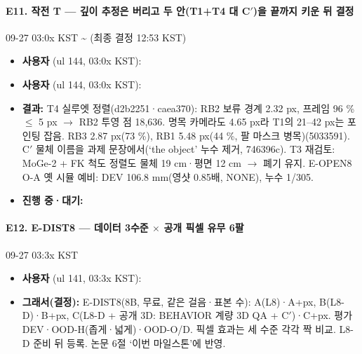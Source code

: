 \paragraph{E11. 작전 T --- 깊이 추정은 버리고 두 안(T1+T4 대 C$'$)을 끝까지 키운 뒤 결정}
{\small 09-27 03:0x KST \textasciitilde{} (최종 결정 12:53 KST)}
\begin{itemize}
  \item \textbf{사용자} (ul 144, 03:0x KST): 
  \item \textbf{사용자} (ul 144, 03:0x KST): 
  \item \textbf{결과:} T4 실루엣 정렬(d2b2251·caea370): RB2 보류 경계 2.32 px, 프레임 96 \% $\leq$ 5 px $\rightarrow$ RB2 투영 점 18,636. 명목 카메라도 4.65 px라 T1의 21--42 px는 포인팅 잡음. RB3 2.87 px(73 \%), RB1 5.48 px(44 \%, 팔 마스크 병목)(5033591). C$'$ 물체 이름을 과제 문장에서(`the object' 누수 제거, 746396c). T3 재검토: MoGe-2 + FK 척도 정렬도 물체 19 cm·평면 12 cm $\rightarrow$ 폐기 유지. E-OPEN8 O-A 옛 시뮬 예비: DEV 106.8 mm(영샷 0.85배, NONE), 누수 1/305.
  \item \textbf{진행 중·대기:} 
\end{itemize}

\paragraph{E12. E-DIST8 --- 데이터 3수준 $\times$ 공개 픽셀 유무 6팔}
{\small 09-27 03:3x KST}
\begin{itemize}
  \item \textbf{사용자} (ul 141, 03:3x KST): 
  \item \textbf{그래서(결정):} E-DIST8(8B, 무료, 같은 걸음·표본 수): A(L8)·A+px, B(L8-D)·B+px, C(L8-D + 공개 3D: BEHAVIOR 계량 3D QA + C$'$)·C+px. 평가 DEV·OOD-H(좁게·넓게)·OOD-O/D. 픽셀 효과는 세 수준 각각 짝 비교. L8-D 준비 뒤 등록. 논문 6절 `이번 마일스톤'에 반영.
\end{itemize}

